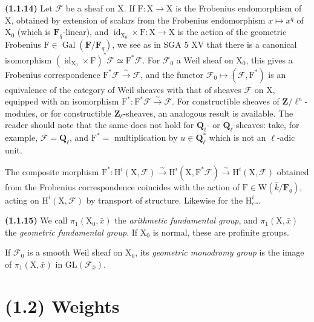 \documentclass[11pt,leqno]{article}
\begin{document}
\textbf{(1.1.14)} Let \(\mathscr{F}\) be a sheaf on \(\mathrm{X}\). If \(\mathrm{F}:\mathrm{X}\to\mathrm{X}\) is the Frobenius endomorphism of \(\mathrm{X}\), obtained by extension of scalars from the Frobenius endomorphism \(x\mapsto x^q\) of \(\mathrm{X}_0\) (which is \(\mathbf{F}_q\)-linear), and \(\operatorname{id}_{\mathrm{X}_0}\times\mathrm{F}:\mathrm{X}\to\mathrm{X}\) is the action of the geometric Frobenius \(\mathrm{F}\in\operatorname{Gal}(\mathbf{F}/\mathbf{F}_q)\), we see as in SGA 5 XV that there is a canonical isomorphism \((\operatorname{id}_{\mathrm{X}_0}\times\mathrm{F})^*\mathscr{F}\simeq\mathrm{F}^*\mathscr{F}\). For \(\mathscr{F}_0\) a Weil sheaf on \(\mathrm{X}_0\), this gives a Frobenius correspondence \(\mathrm{F}^*\mathscr{F}\xrightarrow{\sim}\mathscr{F}\), and the functor \(\mathscr{F}_0\mapsto(\mathscr{F},\mathrm{F}^*)\) is an equivalence of the category of Weil sheaves with that of sheaves \(\mathscr{F}\) on \(\mathrm{X}\), equipped with an isomorphism \(\mathrm{F}^*:\mathrm{F}^*\mathscr{F}\xrightarrow{\sim}\mathscr{F}\). For constructible sheaves of \(\mathbf{Z}/\ell^n\)-modules, or for constructible \(\mathbf{Z}_\ell\)-sheaves, an analogous result is available. The reader should note that the same does not hold for \(\mathbf{Q}_\ell\)- or \(\overline{\mathbf{Q}}_\ell\)-sheaves: take, for example, \(\mathscr{F}=\mathbf{Q}_\ell\), and \(\mathrm{F}^*=\) multiplication by \(u\in\mathbf{Q}_\ell^*\) which is not an \(\ell\)-adic unit.

The composite morphism \(\mathrm{F}^*:\mathrm{H}^i(\mathrm{X},\mathscr{F})\xrightarrow{\sim}\mathrm{H}^i(\mathrm{X},\mathrm{F}^*\mathscr{F})\xrightarrow{\sim}\mathrm{H}^i(\mathrm{X},\mathscr{F})\) obtained from the Frobenius correspondence coincides with the action of \(\mathrm{F}\in\mathrm{W}(\bar{k}/\mathbf{F}_q)\), acting on \(\mathrm{H}^i(\mathrm{X},\mathscr{F})\) by transport of structure. Likewise for the \(\mathrm{H}_c^i\)\ldots

\textbf{(1.1.15)} We call \(\pi_1(\mathrm{X}_0,\bar{x})\) the \textit{arithmetic fundamental group}, and \(\pi_1(\mathrm{X},\bar{x})\) the \textit{geometric fundamental group}. If \(\mathrm{X}_0\) is normal, these are profinite groups.

If \(\mathscr{F}_0\) is a smooth Weil sheaf on \(\mathrm{X}_0\), its \textit{geometric monodromy group} is the image of \(\pi_1(\mathrm{X},\bar{x})\) in \(\mathrm{GL}(\mathscr{F}_{\bar{x}})\).

\section*{(1.2) Weights}
\end{document}
